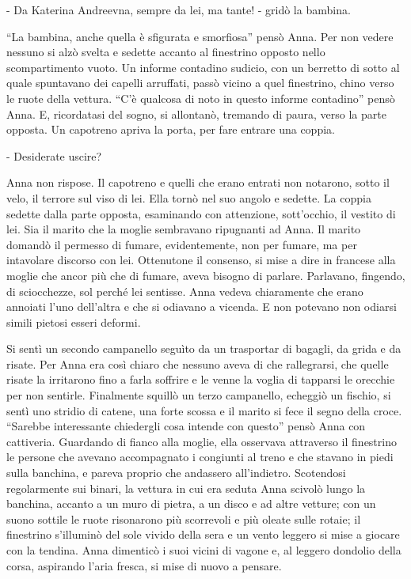 - Da Katerina Andreevna, sempre da lei, ma tante! - gridò la bambina. 

``La bambina, anche quella è sfigurata e smorfiosa'' pensò Anna. Per non vedere nessuno si alzò svelta e sedette accanto al finestrino opposto nello scompartimento vuoto. Un informe contadino sudicio, con un berretto di sotto al quale spuntavano dei capelli arruffati, passò vicino a quel finestrino, chino verso le ruote della vettura. ``C'è qualcosa di noto in questo informe contadino'' pensò Anna. E, ricordatasi del sogno, si allontanò, tremando di paura, verso la parte opposta. Un capotreno apriva la porta, per fare entrare una coppia. 

- Desiderate uscire? 

Anna non rispose. Il capotreno e quelli che erano entrati non notarono, sotto il velo, il terrore sul viso di lei. Ella tornò nel suo angolo e sedette. La coppia sedette dalla parte opposta, esaminando con attenzione, sott'occhio, il vestito di lei. Sia il marito che la moglie sembravano ripugnanti ad Anna. Il marito domandò il permesso di fumare, evidentemente, non per fumare, ma per intavolare discorso con lei. Ottenutone il consenso, si mise a dire in francese alla moglie che ancor più che di fumare, aveva bisogno di parlare. Parlavano, fingendo, di sciocchezze, sol perché lei sentisse. Anna vedeva chiaramente che erano annoiati l'uno dell'altra e che si odiavano a vicenda. E non potevano non odiarsi simili pietosi esseri deformi. 

Si sentì un secondo campanello seguìto da un trasportar di bagagli, da grida e da risate. Per Anna era così chiaro che nessuno aveva di che rallegrarsi, che quelle risate la irritarono fino a farla soffrire e le venne la voglia di tapparsi le orecchie per non sentirle. Finalmente squillò un terzo campanello, echeggiò un fischio, si sentì uno stridio di catene, una forte scossa e il marito si fece il segno della croce. ``Sarebbe interessante chiedergli cosa intende con questo'' pensò Anna con cattiveria. Guardando di fianco alla moglie, ella osservava attraverso il finestrino le persone che avevano accompagnato i congiunti al treno e che stavano in piedi sulla banchina, e pareva proprio che andassero all'indietro. Scotendosi regolarmente sui binari, la vettura in cui era seduta Anna scivolò lungo la banchina, accanto a un muro di pietra, a un disco e ad altre vetture; con un suono sottile le ruote risonarono più scorrevoli e più oleate sulle rotaie; il finestrino s'illuminò del sole vivido della sera e un vento leggero si mise a giocare con la tendina. Anna dimenticò i suoi vicini di vagone e, al leggero dondolio della corsa, aspirando l'aria fresca, si mise di nuovo a pensare. 

